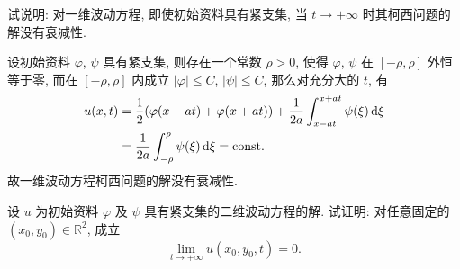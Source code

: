 \begin{exercise}
  试说明: 对一维波动方程, 即使初始资料具有紧支集,
  当 $t\to +\infty$ 时其柯西问题的解没有衰减性.
\end{exercise}

\begin{solve}
  设初始资料 $\varphi$, $\psi$ 具有紧支集, 则存在一个常数 $\rho>0$,
  使得 $\varphi$, $\psi$ 在 $[-\rho,\rho]$ 外恒等于零,
  而在 $[-\rho,\rho]$ 内成立 $|\varphi|\leq C$, $|\psi|\leq C$, 那么对充分大的 $t$, 有
  \begin{align*}
    u(x,t)
    & = \frac{1}{2}(\varphi(x-at)
        +\varphi(x+at))+\frac{1}{2a}\int_{x-at}^{x+at}\psi(\xi)\mathop{}\!\mathrm{d}\xi \\
    & = \frac{1}{2a}\int_{-\rho}^{\rho}\psi(\xi)\mathop{}\!\mathrm{d}\xi= \text{const}.
  \end{align*}
  故一维波动方程柯西问题的解没有衰减性.
\end{solve}


\begin{exercise}
  设 $u$ 为初始资料 $\varphi$ 及 $\psi$ 具有紧支集的二维波动方程的解.
  试证明: 对任意固定的 $(x_0,y_0)\in \mathbb{R}^2$, 成立
  \[\lim_{t\to+\infty} u(x_0,y_0,t) = 0.\]
\end{exercise}

